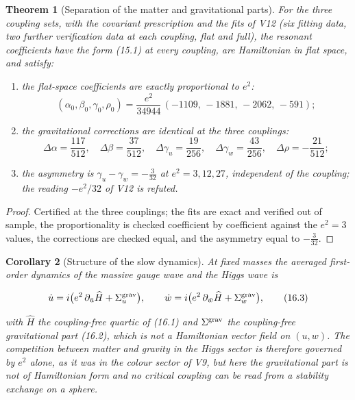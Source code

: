 \documentclass[11pt]{article}
\newtheorem{theorem}{Theorem}[section]
\newtheorem{corollary}[theorem]{Corollary}
\theoremstyle{remark}
\begin{document}
\begin{theorem}[Separation of the matter and gravitational parts]
\label{thm:v20v13-separation}
For the three coupling sets, with the covariant prescription and the
fits of V12 (six fitting data, two further verification data at each
coupling, flat and full), the resonant coefficients have the form
(15.1) at every coupling, are Hamiltonian in flat space, and satisfy:

\begin{enumerate}
\item the flat-space coefficients are exactly proportional to
\(e^2\):
\[
 (\alpha_0,\beta_0,\gamma_0,\rho_0)=\frac{e^2}{34944}\,(-1109,\,-1881,\,-2062,\,-591);  \tag{16.1}
\]
\item the gravitational corrections are identical at the three
couplings:
\[
 \Delta\alpha=\frac{117}{512},\quad\Delta\beta=\frac{37}{512},\quad
 \Delta\gamma_u=\frac{19}{256},\quad\Delta\gamma_w=\frac{43}{256},\quad
 \Delta\rho=-\frac{21}{512};                                            \tag{16.2}
\]
\item the asymmetry is \(\gamma_u-\gamma_w=-\tfrac3{32}\) at
\(e^2=3,12,27\), independent of the coupling; the reading \(-e^2/32\)
of V12 is refuted.
\end{enumerate}
\end{theorem}

\begin{proof}
Certified at the three couplings; the fits are exact and verified
out of sample, the proportionality is checked coefficient by
coefficient against the \(e^2=3\) values, the corrections are checked
equal, and the asymmetry equal to \(-\tfrac3{32}\).
\end{proof}

\begin{corollary}[Structure of the slow dynamics]
\label{cor:v20v13-structure}
At fixed masses the averaged first-order dynamics of the massive gauge
wave and the Higgs wave is

\[
 \dot u=i\bigl(e^2\,\partial_{\bar u}\widehat H+\Sigma^{\rm grav}_u\bigr),\qquad
 \dot w=i\bigl(e^2\,\partial_{\bar w}\widehat H+\Sigma^{\rm grav}_w\bigr),        \tag{16.3}
\]

with \(\widehat H\) the coupling-free quartic of (16.1) and
\(\Sigma^{\rm grav}\) the coupling-free gravitational part (16.2), which
is not a Hamiltonian vector field on \((u,w)\).  The competition
between matter and gravity in the Higgs sector is therefore governed
by \(e^2\) alone, as it was in the colour sector of V9, but here the
gravitational part is not of Hamiltonian form and no critical coupling
can be read from a stability exchange on a sphere.
\end{corollary}
\end{document}
